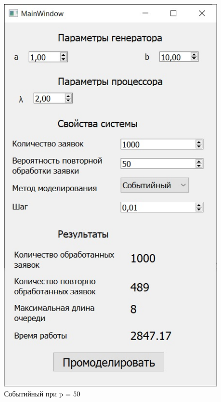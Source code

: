 \documentclass[14pt, a4paper]{extarticle}
\begin{document}
\begin{figure}[h!]
	\centering
	\includegraphics[scale=0.6]{source/event50.jpg}
	\caption{Событийный при p = 50}
\end{figure}
\newpage
\end{document}

